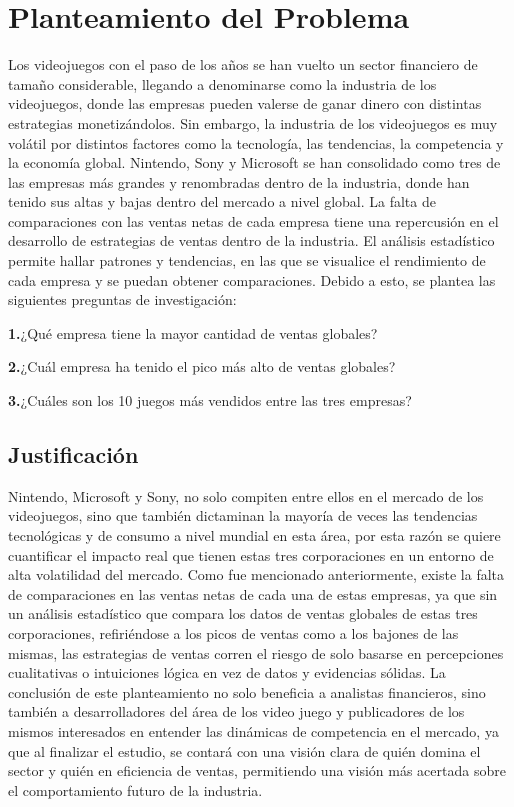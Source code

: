 \documentclass[oneside,11pt]{Latex/Classes/PhDthesisPSnPDF}
\begin{document}
\chapter{Planteamiento del Problema}

Los videojuegos con el paso de los años se han vuelto un sector
financiero de tamaño considerable, llegando a denominarse como la
industria de los videojuegos, donde las empresas pueden valerse de ganar
dinero con distintas estrategias monetizándolos. Sin embargo, la
industria de los videojuegos es muy volátil por distintos factores como
la tecnología, las tendencias, la competencia y la economía global.
Nintendo, Sony y Microsoft se han consolidado como tres de las empresas
más grandes y renombradas dentro de la industria, donde han tenido sus
altas y bajas dentro del mercado a nivel global. La falta de
comparaciones con las ventas netas de cada empresa tiene una repercusión
en el desarrollo de estrategias de ventas dentro de la industria. El
análisis estadístico permite hallar patrones y tendencias, en las que se
visualice el rendimiento de cada empresa y se puedan obtener
comparaciones. Debido a esto, se plantea las siguientes preguntas de
investigación:

\textbf{1.}¿Qué empresa tiene la mayor cantidad de ventas globales?

\textbf{2.}¿Cuál empresa ha tenido el pico más alto de ventas globales?

\textbf{3.}¿Cuáles son los 10 juegos más vendidos entre las tres
empresas?

\section{Justificación}

Nintendo, Microsoft y Sony, no solo compiten entre ellos en el mercado
de los videojuegos, sino que también dictaminan la mayoría de veces las
tendencias tecnológicas y de consumo a nivel mundial en esta área, por
esta razón se quiere cuantificar el impacto real que tienen estas tres
corporaciones en un entorno de alta volatilidad del mercado. Como fue
mencionado anteriormente, existe la falta de comparaciones en las ventas
netas de cada una de estas empresas, ya que sin un análisis estadístico
que compara los datos de ventas globales de estas tres corporaciones,
refiriéndose a los picos de ventas como a los bajones de las mismas, las
estrategias de ventas corren el riesgo de solo basarse en percepciones
cualitativas o intuiciones lógica en vez de datos y evidencias sólidas.
La conclusión de este planteamiento no solo beneficia a analistas
financieros, sino también a desarrolladores del área de los video juego
y publicadores de los mismos interesados en entender las dinámicas de
competencia en el mercado, ya que al finalizar el estudio, se contará
con una visión clara de quién domina el sector y quién en eficiencia de
ventas, permitiendo una visión más acertada sobre el comportamiento
futuro de la industria.
\end{document}
